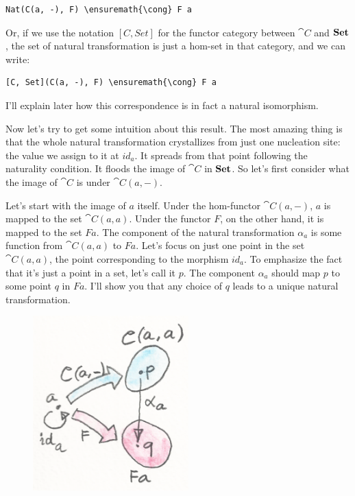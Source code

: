 \begin{Verbatim}[commandchars=\\\{\}]
Nat(C(a, -), F) \ensuremath{\cong} F a
\end{Verbatim}
Or, if we use the notation $[C, Set]$ for the functor
category between $\cat{C}$ and $\mathbf{Set}$, the set of natural
transformation is just a hom-set in that category, and we can write:

\begin{Verbatim}[commandchars=\\\{\}]
[C, Set](C(a, -), F) \ensuremath{\cong} F a
\end{Verbatim}
I'll explain later how this correspondence is in fact a natural
isomorphism.

Now let's try to get some intuition about this result. The most amazing
thing is that the whole natural transformation crystallizes from just
one nucleation site: the value we assign to it at $id_a$. It
spreads from that point following the naturality condition. It floods
the image of $\cat{C}$ in $\mathbf{Set}$. So let's first consider what the
image of $\cat{C}$ is under $\cat{C}(a, -)$.

Let's start with the image of $a$ itself. Under the hom-functor
$\cat{C}(a, -)$, $a$ is mapped to the set $\cat{C}(a, a)$.
Under the functor $F$, on the other hand, it is mapped to the set
$F a$. The component of the natural transformation $α_a$
is some function from $\cat{C}(a, a)$ to $F a$. Let's focus on
just one point in the set $\cat{C}(a, a)$, the point corresponding to
the morphism $id_a$. To emphasize the fact that it's just a point
in a set, let's call it $p$. The component $α_a$ should map
$p$ to some point $q$ in $F a$. I'll show you that
any choice of $q$ leads to a unique natural transformation.

\begin{figure}[H]
\centering
\includegraphics[width=60mm]{images/yoneda3.png}
\end{figure}

